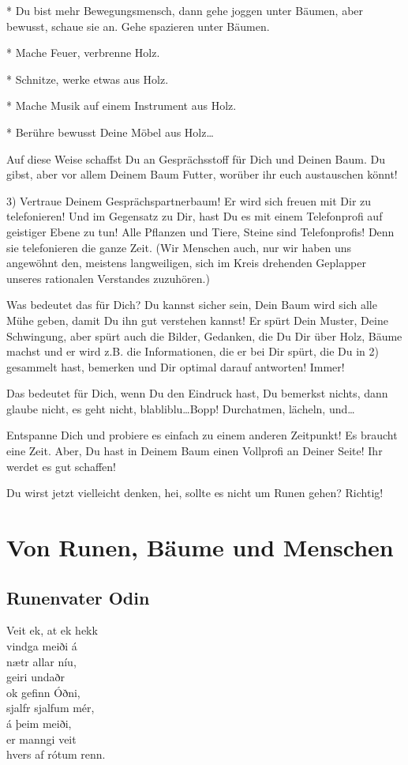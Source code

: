 \documentclass[11pt,titlepage,a5paper]{book}
\begin{document}
* Du bist mehr Bewegungsmensch, dann gehe joggen unter Bäumen, aber bewusst, schaue sie an. Gehe spazieren unter Bäumen.

* Mache Feuer, verbrenne Holz.

* Schnitze, werke etwas aus Holz.

* Mache Musik auf einem Instrument aus Holz.

* Berühre bewusst Deine Möbel aus Holz\dots

Auf diese Weise schaffst Du an Gesprächsstoff für Dich und Deinen Baum. Du gibst, aber vor allem Deinem Baum Futter, worüber ihr euch austauschen könnt! 

3) Vertraue Deinem Gesprächspartnerbaum! Er wird sich freuen mit Dir zu telefonieren! Und im Gegensatz zu Dir, hast Du es mit einem Telefonprofi auf geistiger Ebene zu tun! Alle Pflanzen und Tiere, Steine sind Telefonprofis! Denn sie telefonieren die ganze Zeit. (Wir Menschen auch, nur wir haben uns angewöhnt den, meistens langweiligen, sich im Kreis drehenden Geplapper unseres rationalen Verstandes zuzuhören.)

Was bedeutet das für Dich? Du kannst sicher sein, Dein Baum wird sich alle Mühe geben, damit Du ihn gut verstehen kannst! Er spürt Dein Muster, Deine Schwingung, aber spürt auch die Bilder, Gedanken, die Du Dir über Holz, Bäume machst und er wird z.B. die Informationen, die er bei Dir spürt, die Du in 2) gesammelt hast, bemerken und Dir optimal darauf antworten! Immer!

Das bedeutet für Dich, wenn Du den Eindruck hast, Du bemerkst nichts, dann glaube nicht, es geht nicht, blabliblu\dots Bopp! Durchatmen, lächeln, und\dots

Entspanne Dich und probiere es einfach zu einem anderen Zeitpunkt! Es braucht eine Zeit. Aber, Du hast in Deinem Baum einen Vollprofi an Deiner Seite! Ihr werdet es gut schaffen!

Du wirst jetzt vielleicht denken, hei, sollte es nicht um Runen gehen? Richtig!

\chapter{Von Runen, Bäume und Menschen}

\section{Runenvater Odin}



Veit ek, at ek hekk\\
vindga meiði á\\
nætr allar níu,\\
geiri undaðr\\
ok gefinn Óðni,\\
sjalfr sjalfum mér,\\
á þeim meiði,\\
er manngi veit\\
hvers af rótum renn.\\
\end{document}
